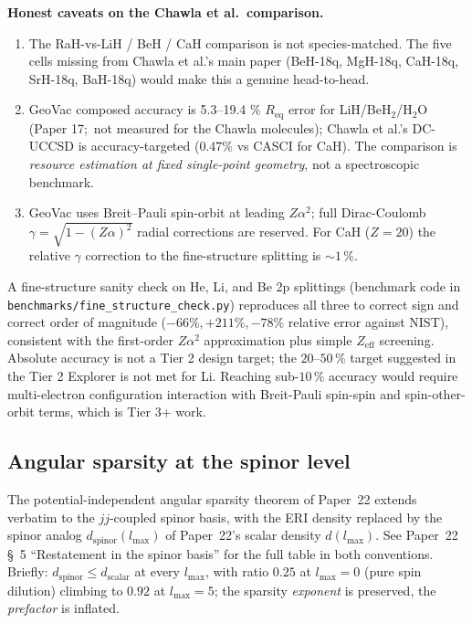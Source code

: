 \documentclass[aps,pra,twocolumn,superscriptaddress,longbibliography]{revtex4-2}
\begin{document}
\textbf{Honest caveats on the Chawla et al.\ comparison.}
\begin{enumerate}
  \item The RaH-vs-LiH / BeH / CaH comparison is not species-matched.
    The five cells missing from Chawla et al.'s main paper (BeH-18q,
    MgH-18q, CaH-18q, SrH-18q, BaH-18q) would make this a genuine
    head-to-head.
  \item GeoVac composed accuracy is 5.3--19.4 \% $R_{\mathrm{eq}}$ error
    for LiH/BeH$_2$/H$_2$O (Paper 17;\ not measured for the Chawla
    molecules); Chawla et al.'s DC-UCCSD is
    accuracy-targeted ($0.47\%$ vs CASCI for CaH). The comparison
    is \emph{resource estimation at fixed single-point geometry},
    not a spectroscopic benchmark.
  \item GeoVac uses Breit--Pauli spin-orbit at leading $Z\alpha^2$;
    full Dirac-Coulomb $\gamma = \sqrt{1-(Z\alpha)^2}$ radial
    corrections are reserved. For CaH ($Z=20$) the relative
    $\gamma$ correction to the fine-structure splitting is
    $\sim 1\,\%$.
\end{enumerate}

A fine-structure sanity check on He, Li, and Be 2p splittings
(benchmark code in
\texttt{benchmarks/fine\_structure\_check.py}) reproduces
all three to correct sign and correct order of magnitude
($-66\%, +211\%, -78\%$ relative error against NIST), consistent
with the first-order $Z\alpha^2$ approximation plus simple
$Z_{\mathrm{eff}}$ screening. Absolute accuracy is not a Tier 2
design target; the $20$--$50\,\%$ target suggested in the Tier 2
Explorer is not met for Li. Reaching sub-$10\,\%$ accuracy would
require multi-electron configuration interaction with Breit-Pauli
spin-spin and spin-other-orbit terms, which is Tier 3+ work.

\subsection{Angular sparsity at the spinor level}
\label{subsec:spinor_sparsity_crossref}

The potential-independent angular sparsity theorem of Paper~22 extends
verbatim to the $jj$-coupled spinor basis, with the ERI density
replaced by the spinor analog $d_{\mathrm{spinor}}(l_{\max})$ of
Paper~22's scalar density $d(l_{\max})$. See Paper~22 \S~5
``Restatement in the spinor basis'' for the full table in both conventions.
Briefly: $d_{\mathrm{spinor}} \leq d_{\mathrm{scalar}}$ at every
$l_{\max}$, with ratio $0.25$ at $l_{\max}=0$ (pure spin dilution)
climbing to $0.92$ at $l_{\max}=5$; the sparsity \emph{exponent}
is preserved, the \emph{prefactor} is inflated.
\end{document}
